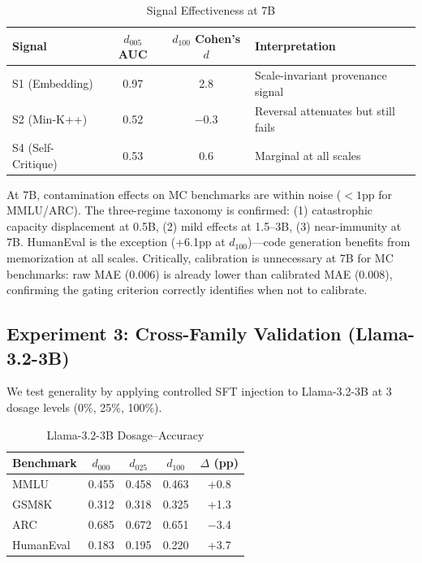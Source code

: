 \documentclass[11pt]{article}
\begin{document}
\begin{table}[h]
\centering
\caption{Signal Effectiveness at 7B}
\label{tab:7b_signal}
\begin{tabular}{lccl}
\toprule
Signal & $d_{005}$ AUC & $d_{100}$ Cohen's $d$ & Interpretation \\
\midrule
S1 (Embedding) & 0.97 & 2.8 & Scale-invariant provenance signal \\
S2 (Min-K++) & 0.52 & $-$0.3 & Reversal attenuates but still fails \\
S4 (Self-Critique) & 0.53 & 0.6 & Marginal at all scales \\
\bottomrule
\end{tabular}
\end{table}

At 7B, contamination effects on MC benchmarks are within noise ($< 1$pp for MMLU/ARC). The three-regime taxonomy is confirmed: (1) catastrophic capacity displacement at 0.5B, (2) mild effects at 1.5--3B, (3) near-immunity at 7B. HumanEval is the exception (+6.1pp at $d_{100}$)---code generation benefits from memorization at all scales. Critically, calibration is unnecessary at 7B for MC benchmarks: raw MAE (0.006) is already lower than calibrated MAE (0.008), confirming the gating criterion correctly identifies when not to calibrate.

\subsection{Experiment 3: Cross-Family Validation (Llama-3.2-3B)}
\label{sec:crossfamily}

We test generality by applying controlled SFT injection to Llama-3.2-3B at 3 dosage levels (0\%, 25\%, 100\%).

\begin{table}[h]
\centering
\caption{Llama-3.2-3B Dosage--Accuracy}
\label{tab:llama_dosage}
\begin{tabular}{lcccc}
\toprule
Benchmark & $d_{000}$ & $d_{025}$ & $d_{100}$ & $\Delta$ (pp) \\
\midrule
MMLU & 0.455 & 0.458 & 0.463 & +0.8 \\
GSM8K & 0.312 & 0.318 & 0.325 & +1.3 \\
ARC & 0.685 & 0.672 & 0.651 & $-$3.4 \\
HumanEval & 0.183 & 0.195 & 0.220 & +3.7 \\
\bottomrule
\end{tabular}
\end{table}
\end{document}
